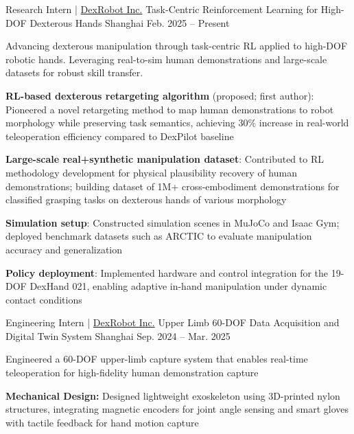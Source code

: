
\vspace{-8mm}

\begin{cventries}
    \cventry
      {Research Intern | \href{https://dex-robot.com}{DexRobot Inc.}} %
      {Task-Centric Reinforcement Learning for High-DOF Dexterous Hands} %
      {Shanghai} %
      {Feb. 2025 -- Present} %
      {
        Advancing dexterous manipulation through task-centric RL applied to high-DOF robotic hands. Leveraging real-to-sim human demonstrations and large-scale datasets for robust skill transfer.
        \begin{cvitems}
          \item{\textbf{RL-based dexterous retargeting algorithm} (proposed; first author): Pioneered a novel retargeting method to map human demonstrations to robot morphology while preserving task semantics, achieving 30\% increase in real-world teleoperation efficiency compared to DexPilot baseline}
          \item{\textbf{Large-scale real+synthetic manipulation dataset}: Contributed to RL methodology development for physical plausibility recovery of human demonstrations; building dataset of 1M+ cross-embodiment demonstrations for classified grasping tasks on dexterous hands of various morphology}
          \item{\textbf{Simulation setup}: Constructed simulation scenes in MuJoCo and Isaac Gym; deployed benchmark datasets such as ARCTIC to evaluate manipulation accuracy and generalization}
          \item{\textbf{Policy deployment}: Implemented hardware and control integration for the 19-DOF DexHand 021, enabling adaptive in-hand manipulation under dynamic contact conditions}
        \end{cvitems}
      }
  \cventry
    {Engineering Intern | \href{https://dex-robot.com}{DexRobot Inc.}} %
    {Upper Limb 60-DOF Data Acquisition and Digital Twin System} %
    {Shanghai} %
    {Sep. 2024 -- Mar. 2025} %
    {
      Engineered a 60-DOF upper-limb capture system that enables real-time teleoperation for high-fidelity human demonstration capture
      \begin{cvitems}
        \item{\textbf{Mechanical Design:} Designed lightweight exoskeleton using 3D-printed nylon structures, integrating magnetic encoders for joint angle sensing and smart gloves with tactile feedback for hand motion capture}

\end{cvitems}}
\end{cventries}
